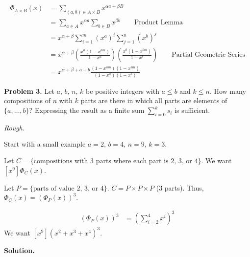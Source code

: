 \begin{align*}
    \Phi_{A\times B}(x)
     & =\sum\limits_{(a,b)\in A\times B}x^{\alpha a+\beta B}                         \\
     & =\sum\limits_{a\in A}x^{\alpha a}\sum\limits_{b\in B}x^{\beta b}\qquad\text{Product Lemma}              \\
     & =x^{\alpha+\beta} \sum\limits_{i=1}^{m} (x^a)^i \sum\limits_{j=1}^{n} (x^b)^j \\
     & =x^{\alpha+\beta}\left( \frac{x^a(1-x^{am})}{1-x^a}  \right)
     \left( \frac{x^b(1-x^{bm})}{1-x^b}  \right)\qquad\text{Partial Geometric Series}                                                   \\
     & =x^{\alpha + \beta + a + b}
    \frac{(1-x^{am})(1-x^{bm})}{(1-x^a)(1-x^b)}
\end{align*}

\textbf{Problem 3.} Let $ a,\,b,\,n,\,k $ be positive integers with $ a\le b $
and $ k\le n $. How many compositions of $ n $ with $ k $ parts are there in which
all parts are elements of $ \{a,\ldots ,b\} $? Expressing the result as a finite
sum $ \sum\limits_{i=0}^{k} s_i $ is sufficient.

\emph{Rough.}

Start with a small example $ a=2,\,b=4,\,n=9,\,k=3 $.

Let $ C=\{\text{compositions with 3 parts where each part is 2, 3, or 4}\} $.
We want $ [x^9]\Phi_C(x) $.

Let $ P=\{\text{parts of value 2, 3, or 4}\} $. $ C=P\times P \times P $ (3 parts).
Thus, $ \Phi_C(x)=(\Phi_P(x))^3 $.

\begin{align*}
    (\Phi_P(x))^3 & =\left( \sum\limits_{i=2}^{4} x^i \right)^3
\end{align*}
We want $ [x^9](x^2+x^3+x^4)^3 $.

\textbf{Solution.}

